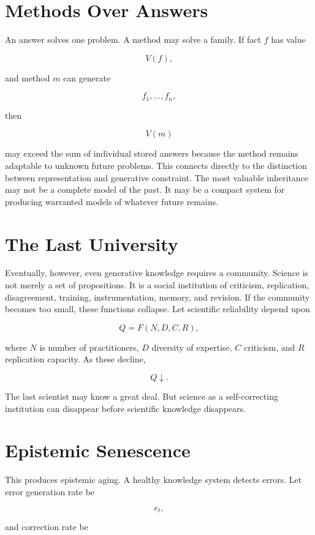 \documentclass[11pt,oneside]{book}
\theoremstyle{definition}
\theoremstyle{remark}
\begin{document}
\section{Methods Over Answers}

An answer solves one problem. A method may solve a family. If fact \(f\) has value

\[
V(f),
\]

and method \(m\) can generate

\[
f_1,\ldots,f_n,
\]

then

\[
V(m)
\]

may exceed the sum of individual stored answers because the method remains adaptable to unknown
future problems. This connects directly to the distinction between representation and generative
constraint. The most valuable inheritance may not be a complete model of the past. It may be a
compact system for producing warranted models of whatever future remains.

\section{The Last University}

Eventually, however, even generative knowledge requires a community. Science is not merely a set of
propositions. It is a social institution of criticism, replication, disagreement, training,
instrumentation, memory, and revision. If the community becomes too small, these functions collapse.
Let scientific reliability depend upon

\[
Q = F(N,D,C,R),
\]

where \(N\) is number of practitioners, \(D\) diversity of expertise, \(C\) criticism, and \(R\)
replication capacity. As these decline,

\[
Q\downarrow.
\]

The last scientist may know a great deal. But science as a self-correcting institution can disappear
before scientific knowledge disappears.

\section{Epistemic Senescence}

This produces epistemic aging. A healthy knowledge system detects errors. Let error generation rate
be

\[
e_t,
\]

and correction rate be
\end{document}
